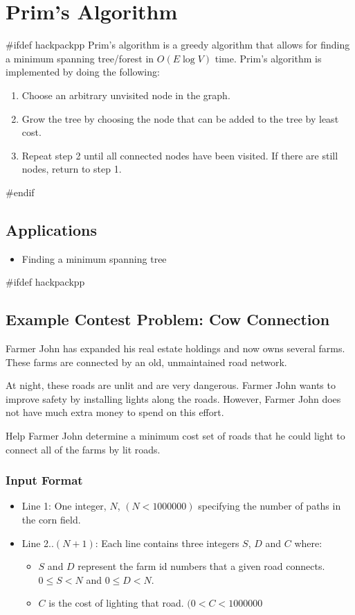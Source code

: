 \section{Prim's Algorithm}
#ifdef hackpackpp
Prim's algorithm is a greedy algorithm that allows for finding a minimum spanning tree/forest in $O(E  \log{V})$ time.
Prim's algorithm is implemented by doing the following:

\begin{enumerate}
	\item Choose an arbitrary unvisited node in the graph.
	\item Grow the tree by choosing the node that can be added to the tree by least cost.
	\item Repeat step 2 until all connected nodes have been visited. If there are still nodes, return to step 1.
\end{enumerate}

#endif
\subsection{Applications}
\begin{itemize}
	\item Finding a minimum spanning tree
\end{itemize}

#ifdef hackpackpp
\subsection{Example Contest Problem: Cow Connection}
Farmer John has expanded his real estate holdings and now owns several farms.
These farms are connected by an old, unmaintained road network. 

At night, these roads are unlit and are very dangerous.
Farmer John wants to improve safety by installing lights along the roads.
However, Farmer John does not have much extra money to spend on this effort.

Help Farmer John determine a minimum cost set of roads that he could light to connect all of the farms by lit roads.
\subsubsection{Input Format}
\begin{itemize}
\item Line 1: One integer, $N$, $(N < 1000000)$ specifying the number of paths in the corn field.
\item Line 2..$(N+1)$: Each line contains three integers $S$, $D$ and $C$ where:
	\begin{itemize}
		\item $S$ and $D$ represent the farm id numbers that a given road connects. $0 \leq S < N$ and $0 \leq D < N$.
		\item $C$ is the cost of lighting that road. $(0 < C < 1000000$
	\end{itemize}
\end{itemize}

